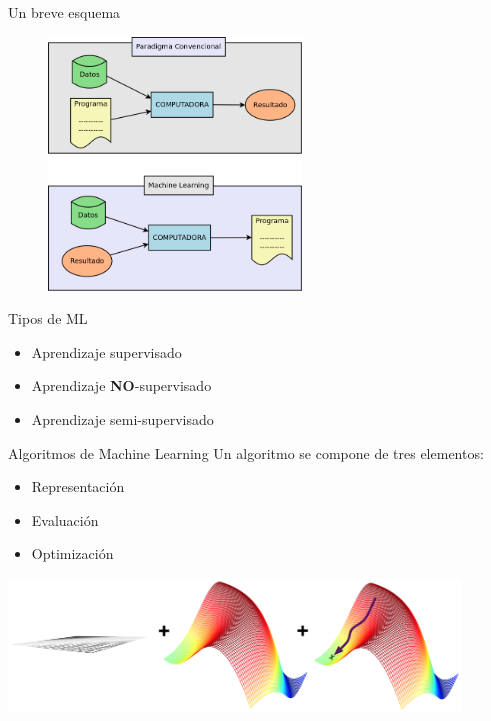 \documentclass[11pt]{beamer}
\begin{document}
\begin{frame}{Un breve esquema}
    \begin{figure}
        \centering
        \includegraphics[width=0.6\textwidth]{images/ML_vs_programming.png}
        \label{fig:ML_vs_conventional}
    \end{figure}
\end{frame}

\begin{frame}{Tipos de ML}
    \begin{itemize}
        \item Aprendizaje supervisado 
        \item Aprendizaje \textbf{NO}-supervisado
        \item Aprendizaje semi-supervisado
    \end{itemize}
\end{frame}

\begin{frame}{Algoritmos de Machine Learning}
    Un algoritmo se compone de tres elementos:
    \begin{itemize}%
        \item Representaci\'on
        \item Evaluaci\'on
        \item Optimizaci\'on
    \end{itemize}

\includegraphics[width=0.9\textwidth]{images/representation+evaluation+optimization.png}

\end{frame}
\end{document}

